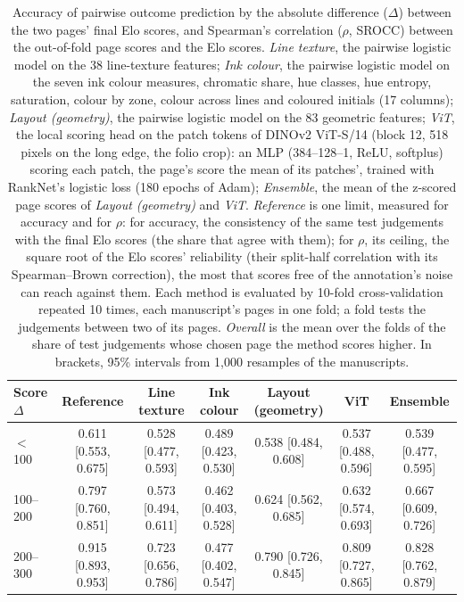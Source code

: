 \begin{table}[htbp]
  \centering
  \caption{Accuracy of pairwise outcome prediction by the absolute difference ($\Delta$) between the two pages' final Elo scores, and Spearman's correlation ($\rho$, SROCC) between the out-of-fold page scores and the Elo scores. \emph{Line texture}, the pairwise logistic model on the 38 line-texture features; \emph{Ink colour}, the pairwise logistic model on the seven ink colour measures, chromatic share, hue classes, hue entropy, saturation, colour by zone, colour across lines and coloured initials (17 columns); \emph{Layout (geometry)}, the pairwise logistic model on the 83 geometric features; \emph{ViT}, the local scoring head on the patch tokens of DINOv2 ViT-S/14 (block 12, 518 pixels on the long edge, the folio crop): an MLP (384--128--1, ReLU, softplus) scoring each patch, the page's score the mean of its patches', trained with RankNet's logistic loss (180 epochs of Adam); \emph{Ensemble}, the mean of the z-scored page scores of \emph{Layout (geometry)} and \emph{ViT}. \emph{Reference} is one limit, measured for accuracy and for $\rho$: for accuracy, the consistency of the same test judgements with the final Elo scores (the share that agree with them); for $\rho$, its ceiling, the square root of the Elo scores' reliability (their split-half correlation with its Spearman--Brown correction), the most that scores free of the annotation's noise can reach against them. Each method is evaluated by 10-fold cross-validation repeated 10 times, each manuscript's pages in one fold; a fold tests the judgements between two of its pages. \emph{Overall} is the mean over the folds of the share of test judgements whose chosen page the method scores higher. In brackets, 95\% intervals from 1,000 resamples of the manuscripts.}
  \label{tab:accuracy_by_elo_gap}
  \begin{tabular}{lcccccc}
    \toprule
    Score $\Delta$ & Reference & Line texture & Ink colour & Layout (geometry) & ViT & Ensemble \\
    \midrule
    $<$100 & 0.611 [0.553, 0.675] & 0.528 [0.477, 0.593] & 0.489 [0.423, 0.530] & 0.538 [0.484, 0.608] & 0.537 [0.488, 0.596] & 0.539 [0.477, 0.595] \\
    100--200 & 0.797 [0.760, 0.851] & 0.573 [0.494, 0.611] & 0.462 [0.403, 0.528] & 0.624 [0.562, 0.685] & 0.632 [0.574, 0.693] & 0.667 [0.609, 0.726] \\
    200--300 & 0.915 [0.893, 0.953] & 0.723 [0.656, 0.786] & 0.477 [0.402, 0.547] & 0.790 [0.726, 0.845] & 0.809 [0.727, 0.865] & 0.828 [0.762, 0.879] \\

\end{tabular}
\end{table}
